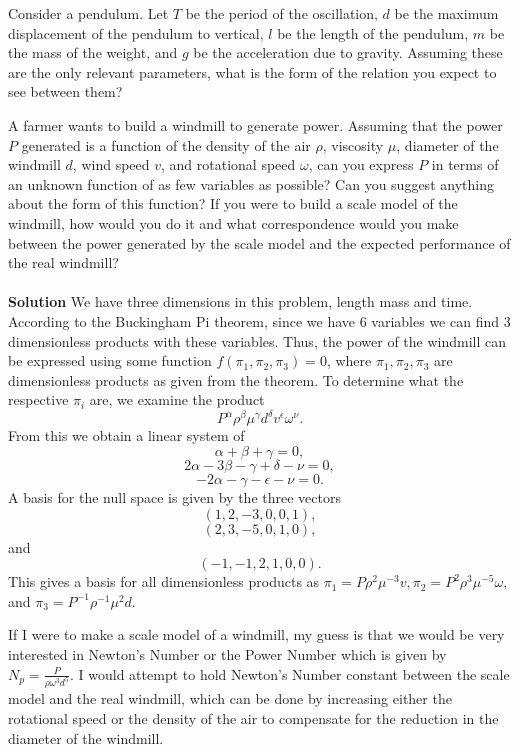\documentclass[12pt]{article}
\newenvironment{exercise}[2][Exercise]{\begin{trivlist}
\item[\hskip \labelsep {\bfseries #1}\hskip \labelsep {\bfseries #2.}]}{\end{trivlist}}
\begin{document}
\begin{exercise}{2}
Consider a pendulum. Let $T$ be the period of the oscillation, $d$ be the maximum displacement of the pendulum to vertical, $l$ be the length of the pendulum, $m$ be the mass of the weight, and $g$ be the acceleration due to gravity. Assuming these are the only relevant parameters, what is the form of the relation you expect to see between them?
\end{exercise}

\begin{exercise}{3}
A farmer wants to build a windmill to generate power. Assuming that the power $P$
generated is a function of the density of the air $\rho$, viscosity $\mu$, diameter of the windmill $d$, wind speed $v$, and rotational speed $\omega$, can you express $P$ in terms of an unknown function of as few variables as possible? Can you suggest anything about the form of this function? If you were to build a scale model of the windmill, how would you do it and what correspondence would you make between the power generated by the scale model and the expected performance of the real windmill?
\\
\\
\textbf{Solution}
We have three dimensions in this problem, length mass and time. According to the Buckingham Pi theorem, since we have 6 variables we can find 3 dimensionless products with these variables. Thus, the power of the windmill can be expressed using some function $f(\pi_1, \pi_2, \pi_3) = 0$, where $\pi_1, \pi_2, \pi_3$ are dimensionless products as given from the theorem. To determine what the respective $\pi_i$ are, we examine the product 
$$P^\alpha \rho^\beta \mu^\gamma d^\delta v^\epsilon \omega^\nu.$$
From this we obtain a linear system of $$\alpha + \beta + \gamma = 0,$$ $$2 \alpha - 3\beta - \gamma + \delta - \nu = 0,$$ $$-2 \alpha - \gamma -  \epsilon - \nu = 0.$$ A basis for the null space is given by the three vectors $$(1, 2, -3, 0, 0, 1),$$ $$(2, 3, -5, 0, 1, 0),$$ and $$(-1, -1, 2, 1, 0, 0).$$ This gives a basis for all dimensionless products as $\pi_1 = P \rho^2 \mu^{-3} v, \pi_2 = P^2 \rho^3 \mu^{-5} \omega,$ and $\pi_3 = P^{-1} \rho^{-1} \mu^2d$.

If I were to make a scale model of a windmill, my guess is that we would be very interested in Newton's Number or the Power Number which is given by $N_p = \frac{P}{\rho \omega^3 d^5}$. I would attempt to hold Newton's Number constant between the scale model and the real windmill, which can be done by increasing either the rotational speed or the density of the air to compensate for the reduction in the diameter of the windmill.
\end{exercise}
\end{document}

